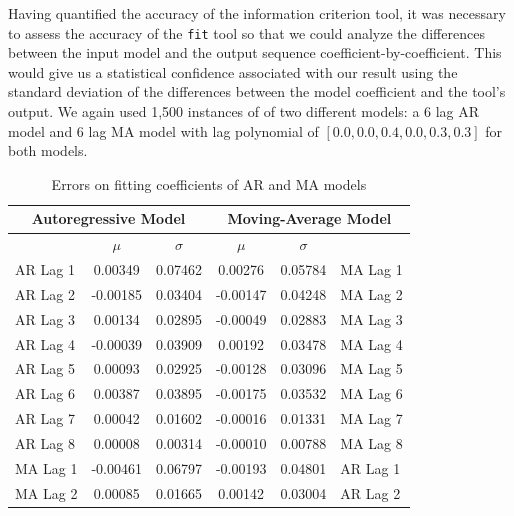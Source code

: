\documentclass[oneside,12pt,openany]{book}
\begin{document}
	Having quantified the accuracy of the information criterion tool, it was necessary to assess the accuracy of the \texttt{fit} tool so that we could analyze the differences between the input model and the output sequence coefficient-by-coefficient. This would give us a statistical confidence associated with our result using the standard deviation of the differences between the model coefficient and the tool's output. We again used 1,500 instances of of two different models: a 6 lag AR model and 6 lag MA model with lag polynomial of $[0.0,0.0,0.4,0.0,0.3,0.3]$ for both models.
	
	\begin{table}[!ht]
		\centering
		\begin{tabular}{|l|c|c|c|c|l|}
			\hline
			\multicolumn{3}{|c|}{\textbf{Autoregressive Model}}   & \multicolumn{3}{c|}{\textbf{Moving-Average Model}}     \\ \hline
			\cellcolor{black} & $\mu$ & $\sigma$ & $\mu$ & $\sigma$ & \cellcolor{black}         \\ \hline
			AR Lag 1 & 0.00349                  & 0.07462                    & 0.00276                  & 0.05784                    & MA Lag 1 \\ \hline
			AR Lag 2 & -0.00185                 & 0.03404                    & -0.00147                 & 0.04248                    & MA Lag 2 \\ \hline
			AR Lag 3 & 0.00134                  & 0.02895                    & -0.00049                 & 0.02883                    & MA Lag 3 \\ \hline
			AR Lag 4 & -0.00039                 & 0.03909                    & 0.00192                  & 0.03478                    & MA Lag 4 \\ \hline
			AR Lag 5 & 0.00093                  & 0.02925                    & -0.00128                 & 0.03096                    & MA Lag 5 \\ \hline
			AR Lag 6 & 0.00387                  & 0.03895                    & -0.00175                 & 0.03532                    & MA Lag 6 \\ \hline
			AR Lag 7 & 0.00042                  & 0.01602                    & -0.00016                 & 0.01331                    & MA Lag 7 \\ \hline
			AR Lag 8 & 0.00008                   & 0.00314                    & -0.00010                  & 0.00788                    & MA Lag 8 \\ \hline
			MA Lag 1 & -0.00461                 & 0.06797                    & -0.00193                 & 0.04801                    & AR Lag 1 \\ \hline
			MA Lag 2 & 0.00085                  & 0.01665                    & 0.00142                  & 0.03004                    & AR Lag 2 \\ \hline
		\end{tabular}
		\caption{Errors on fitting coefficients of AR and MA models}
		\label{tab:errortsfitting}
	\end{table}
\end{document}
